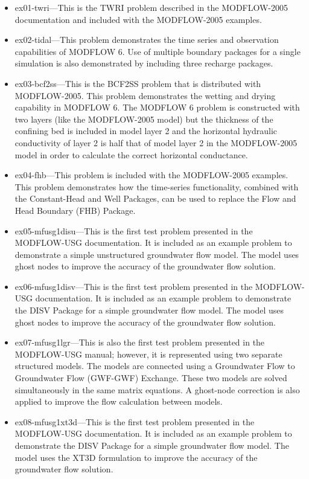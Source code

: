 \begin{itemize}
\item ex01-twri---This is the TWRI problem described in the MODFLOW-2005 documentation and included with the MODFLOW-2005 examples. 
\item ex02-tidal---This problem demonstrates the time series and observation capabilities of MODFLOW 6.  Use of multiple boundary packages for a single simulation is also demonstrated by including three recharge packages.
\item ex03-bcf2ss---This is the BCF2SS problem that is distributed with MODFLOW-2005.  This problem demonstrates the wetting and drying capability in MODFLOW 6. The MODFLOW 6 problem is constructed with two layers (like the MODFLOW-2005 model) but the thickness of the confining bed is included in model layer 2 and the horizontal hydraulic conductivity of layer 2 is half that of model layer 2 in the MODFLOW-2005 model in order to calculate the correct horizontal conductance.
\item ex04-fhb---This problem is included with the MODFLOW-2005 examples. This problem demonstrates how the time-series functionality, combined with the Constant-Head and Well Packages, can be used to replace the Flow and Head Boundary (FHB) Package.
\item ex05-mfusg1disu---This is the first test problem presented in the MODFLOW-USG documentation.  It is included as an example problem to demonstrate a simple unstructured groundwater flow model.  The model uses ghost nodes to improve the accuracy of the groundwater flow solution.
\item ex06-mfusg1disv---This is the first test problem presented in the MODFLOW-USG documentation.  It is included as an example problem to demonstrate the DISV Package for a simple groundwater flow model.  The model uses ghost nodes to improve the accuracy of the groundwater flow solution.
\item ex07-mfusg1lgr---This is also the first test problem presented in the MODFLOW-USG manual; however, it is represented using two separate structured models.  The models are connected using a Groundwater Flow to Groundwater Flow (GWF-GWF) Exchange.  These two models are solved simultaneously in the same matrix equations.  A ghost-node correction is also applied to improve the flow calculation between models.
\item ex08-mfusg1xt3d---This is the first test problem presented in the MODFLOW-USG documentation.  It is included as an example problem to demonstrate the DISV Package for a simple groundwater flow model.  The model uses the XT3D formulation to improve the accuracy of the groundwater flow solution.

\end{itemize}
